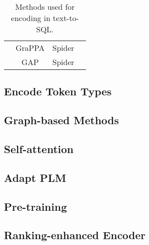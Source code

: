 \begin{table}
\begin{tabular}{|c|c|c|c|}
                                        & GraPPA              & Spider                    &                                                                                                            \\
                                        & GAP                 & Spider                    &                                                                                                            \\
        \hline
    \end{tabular}
    \caption{Methods used for encoding in text-to-SQL.}
    \label{tab:methods}
\end{table}


\subsection{Encode Token Types}

\subsection{Graph-based Methods}

\subsection{Self-attention}

\subsection{Adapt PLM} %

\subsection{Pre-training}

\subsection{Ranking-enhanced Encoder}

